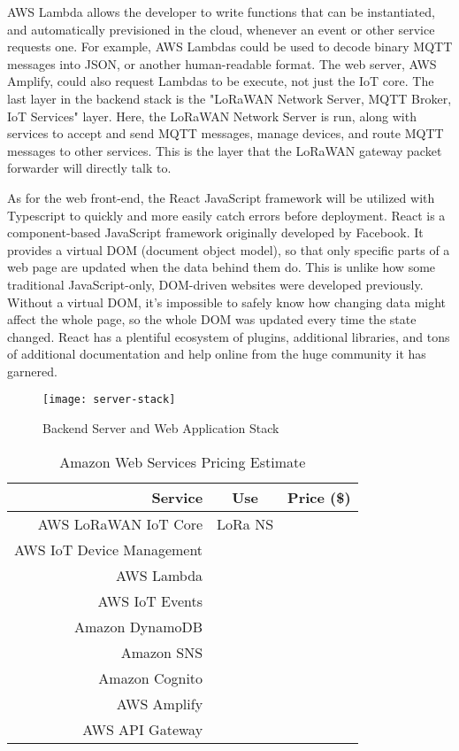 AWS Lambda allows the developer to write functions that can be instantiated, and automatically
previsioned in the cloud, whenever an event or other service requests one. For example, AWS Lambdas
could be used to decode binary MQTT messages into JSON, or another human-readable format. The web
server, AWS Amplify, could also request Lambdas to be execute, not just the IoT core. The last layer
in the backend stack is the "LoRaWAN Network Server, MQTT Broker, IoT Services" layer. Here, the
LoRaWAN Network Server is run, along with services to accept and send MQTT messages, manage devices,
and route MQTT messages to other services. This is the layer that the LoRaWAN gateway packet
forwarder will directly talk to.

As for the web front-end, the React JavaScript framework will be utilized with Typescript to quickly
and more easily catch errors before deployment. React is a component-based JavaScript framework
originally developed by Facebook. It provides a virtual DOM (document object model), so that only
specific parts of a web page are updated when the data behind them do. This is unlike how some
traditional JavaScript-only, DOM-driven websites were developed previously. Without a virtual DOM,
it's impossible to safely know how changing data might affect the whole page, so the whole DOM was
updated every time the state changed. React has a plentiful ecosystem of plugins, additional
libraries, and tons of additional documentation and help online from the huge community it has
garnered.

\begin{figure}
  \centering
  \texttt{[image: server-stack]}
  \caption{Backend Server and Web Application Stack}
  \label{server-stack}
\end{figure}

\begin{table}[H]
\centering\scriptsize
\caption{Amazon Web Services Pricing Estimate}
\begin{tabular}{|r|c|c|}
\hline
Service & Use & Price (\$)\\
\hline\hline

AWS LoRaWAN IoT Core & LoRa NS & \\\hline
AWS IoT Device Management & & \\\hline
AWS Lambda & & \\\hline
AWS IoT Events & & \\\hline
Amazon DynamoDB & & \\\hline
Amazon SNS & & \\\hline
Amazon Cognito & & \\\hline
AWS Amplify & & \\\hline
AWS API Gateway & & \\\hline

\end{tabular}
\label{tbl:aws-pricing}
\end{table}
